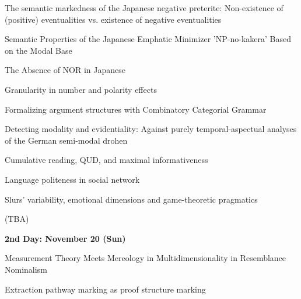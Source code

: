 \documentclass[12pt]{jarticle}
\begin{document}



 
  
      {The semantic markedness of the Japanese negative preterite: Non-existence of (positive) eventualities vs. existence of negative eventualities}
      {}
  
      {Semantic Properties of the Japanese Emphatic Minimizer 'NP-no-kakera' Based on the Modal Base}
      {}
  
      {The Absence of NOR in Japanese}
      {}



 
  
      {Granularity in number and polarity effects}
      {}
  
      {Formalizing argument structures with Combinatory Categorial Grammar}
      {}
  
      {Detecting modality and evidentiality: Against purely temporal-aspectual analyses of the German semi-modal drohen}
      {}



 
  
      {Cumulative reading, QUD, and maximal informativeness}
      {}
  
      {Language politeness in social network}
      {}
  
      {Slurs' variability, emotional dimensions and game-theoretic pragmatics}
      {}




  
      {(TBA)}
      {}




\noindent\textbf{\large 
2nd Day: November 20 (Sun)
}\\




  
      {Measurement Theory Meets Mereology in Multidimensionality in Resemblance Nominalism}
      {}
  
      {Extraction pathway marking as proof structure marking}
      {}
  
\end{document}
